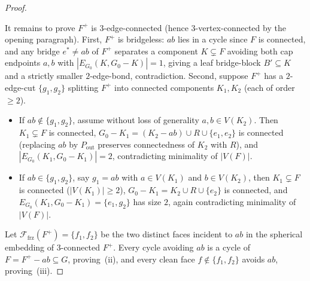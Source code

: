 \documentclass[11pt,reqno]{amsart}
\theoremstyle{plain}
\theoremstyle{definition}
\theoremstyle{remark}
\newcommand{\Ffrz}{\mathcal{F}_{\mathrm{frz}}}
\DeclareRobustCommand{\_}{\ifmmode\text{\textunderscore}\else\textunderscore\allowbreak\fi}
\begin{document}
\begin{proof}
\begin{enumerate}[label=\textbf{Claim \arabic*.},leftmargin=4.8em]
  It remains to prove $F^+$ is $3$-edge-connected (hence $3$-vertex-connected by the opening paragraph). First, $F^+$ is bridgeless: $ab$ lies in a cycle since $F$ is connected, and any bridge $e^* \neq ab$ of $F^+$ separates a component $K \subsetneq F$ avoiding both cap endpoints $a, b$ with $|E_{G_0}(K, G_0 - K)| = 1$, giving a leaf bridge-block $B' \subseteq K$ and a strictly smaller $2$-edge-bond, contradiction. Second, suppose $F^+$ has a $2$-edge-cut $\{g_1, g_2\}$ splitting $F^+$ into connected components $K_1, K_2$ (each of order $\ge 2$).
  \begin{itemize}[leftmargin=1.5em]
    \item If $ab \notin \{g_1, g_2\}$, assume without loss of generality $a, b \in V(K_2)$. Then $K_1 \subsetneq F$ is connected, $G_0 - K_1 = (K_2 - ab) \cup R \cup \{e_1, e_2\}$ is connected (replacing $ab$ by $P_{\mathrm{out}}$ preserves connectedness of $K_2$ with $R$), and $|E_{G_0}(K_1, G_0 - K_1)| = 2$, contradicting minimality of $|V(F)|$.
    \item If $ab \in \{g_1, g_2\}$, say $g_1 = ab$ with $a \in V(K_1)$ and $b \in V(K_2)$, then $K_1 \subsetneq F$ is connected ($|V(K_1)| \ge 2$), $G_0 - K_1 = K_2 \cup R \cup \{e_2\}$ is connected, and $E_{G_0}(K_1, G_0 - K_1) = \{e_1, g_2\}$ has size $2$, again contradicting minimality of $|V(F)|$.
  \end{itemize}
\end{enumerate}

Let $\Ffrz(F^+) = \{f_1, f_2\}$ be the two distinct faces incident to $ab$ in the spherical embedding of $3$-connected $F^+$. Every cycle avoiding $ab$ is a cycle of $F = F^+ - ab \subseteq G$, proving~(ii), and every clean face $f \notin \{f_1, f_2\}$ avoids $ab$, proving~(iii).
\end{proof}
\end{document}
